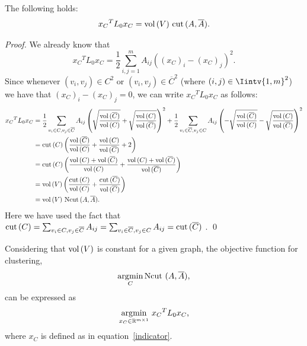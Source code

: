 \begin{theorem}
   The following holds:
   \begin{equation}
      {x_C}^TL_0{x_C} = \operatorname*{vol\,}(V)\, \operatorname{cut\,} (A, \overline A).
   \end{equation}
\end{theorem}
\begin{proof}
   We already know that
   \begin{equation*}
         {x_C}^TL_0{x_C} = \frac{1}{2} \sum_{i,j=1}^m A_{ij} ((x_C)_i - (x_C)_j) ^2 .
   \end{equation*}
   Since whenever $(v_i, v_j) \in C^2$ or $(v_i, v_j) \in {\overline C}^2$ (where $(i,j) \in \Iintv{1,m}^2$) we have that $(x_C)_i - (x_C)_j = 0$, we can write ${x_C}^TL_0{x_C}$ as follows:
   \begin{equation*}
      \begin{split}
         {x_C}^TL_0{x_C} &=  \frac{1}{2} \sum_{v_i \in C, v_j \in \overline C}A_{ij} \left( \sqrt{\frac{\operatorname*{vol\,} (\overline C)}{\operatorname*{vol\,} (C)}} + \sqrt{\frac{\operatorname*{vol\,} (C)}{\operatorname*{vol\,} (\overline C)}} \right)^2 + \frac{1}{2} \sum_{v_i \in \overline C, v_j \in C} A_{ij} \left( -\sqrt{\frac{\operatorname*{vol\,} (\overline C)}{\operatorname*{vol\,} (C)}}  -\sqrt{\frac{\operatorname*{vol\,} (C)}{\operatorname*{vol\,} (\overline C)}} \right)^2 \\
         &= \operatorname{cut\,} (C) \left( \frac{\operatorname*{vol\,} (\overline C)}{\operatorname*{vol\,} (C)} + \frac{\operatorname*{vol\,} (C)}{\operatorname*{vol\,} (\overline C)} + 2 \right) \\
         &= \operatorname{cut\,} (C) \left( \frac{\operatorname*{vol\,} (C) + \operatorname*{vol\,} (\overline C)}{\operatorname*{vol\,} (C)} + \frac{\operatorname*{vol\,} (C) + \operatorname*{vol\,} (\overline C)}{\operatorname*{vol\,} (\overline C)} \right) \\
         &= \operatorname*{vol\,} (V) \left( \frac{\operatorname{cut\,}(C)}{\operatorname*{vol\,} (C)} + \frac{\operatorname{cut\,}(\overline C)}{\operatorname*{vol\,} (\overline C)} \right) \\
         &= \operatorname*{vol\,} (V)\, \operatorname*{Ncut\,}(A, \overline A).
      \end{split}
   \end{equation*}
   Here we have used the fact that $\operatorname{cut\,}(C) = \sum_{v_i \in C, v_j \in \overline C} A_{ij} =\sum_{v_i \in \overline C, v_j \in C} A_{ij} = \operatorname{cut\,}(\overline C)$ . \qed
\end{proof}

Considering that $\operatorname*{vol\,} (V)$ is constant for a given graph, the objective function for clustering,
\begin{equation}
   \operatorname*{\arg\!\min}_C \operatorname*{Ncut\,}\,(A, \overline A),
\end{equation}
can be expressed as
\begin{equation}
   \operatorname*{\arg\!\min}_{x_C \in \mathbb R^{m \times 1}} \,{x_C}^T L_0 x_C \text{,}
\end{equation}
where $x_C$ is defined as in equation~\vref{indicator}.

